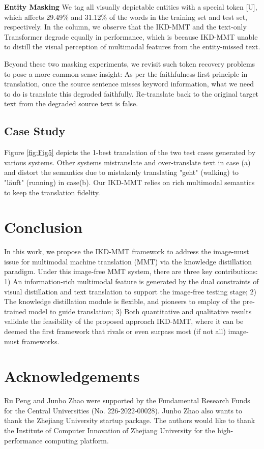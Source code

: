 \documentclass[11pt]{article}
\begin{document}
\textbf{Entity Masking}
We tag all visually depictable entities \cite{plummer2015flickr30k} with a special token [U], which affects 29.49\% and 31.12\% of the words in the training set and test set, respectively.
In the  column, we observe that the IKD-MMT and the text-only Transformer degrade equally in performance, which is because IKD-MMT unable to distill the visual perception of multimodal features from the entity-missed text.

Beyond these two masking experiments, we revisit such token recovery problems to pose a more common-sense insight:
As per the faithfulness-first principle \cite{koehn2009statistical} in translation, once the source sentence misses keyword information, what we need to do is translate this degraded faithfully. Re-translate back to the original target text from the degraded source text is false.

\subsection{Case Study}
Figure \ref{fig:Fig5} depicts the 1-best translation of the two test cases generated by various systems.
Other systems mistranslate and over-translate text in case (a) and distort the semantics due to mistakenly translating "geht" (walking) to "läuft" (running) in case(b).
Our IKD-MMT relies on rich multimodal semantics to keep the translation fidelity.

\section{Conclusion}
In this work, we propose the IKD-MMT framework to address the image-must issue for multimodal machine translation (MMT) via the knowledge distillation paradigm.
Under this image-free MMT system, there are three key contributions:
1) An information-rich multimodal feature is generated by the dual constraints of visual distillation and text translation to support the image-free testing stage;
2) The knowledge distillation module is flexible, and pioneers to employ of the pre-trained model to guide translation;
3) Both quantitative and qualitative results validate the feasibility of the proposed approach IKD-MMT, where it can be deemed the first framework that rivals or even surpass most (if not all) image-must frameworks.

\section*{Acknowledgements}
Ru Peng and Junbo Zhao were supported by the Fundamental Research Funds for the Central Universities (No. 226-2022-00028).
Junbo Zhao also wants to thank the Zhejiang University startup package.
The authors would like to thank the Institute of Computer Innovation of Zhejiang University for the high-performance computing platform.
\end{document}
